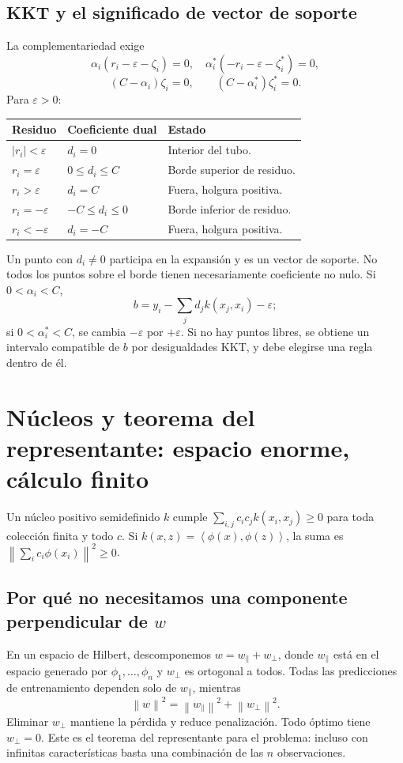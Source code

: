 \documentclass[11pt,a4paper]{article}
\newcommand{\norm}[1]{\left\lVert #1\right\rVert}
\newcommand{\ip}[2]{\left\langle #1,#2\right\rangle}
\theoremstyle{definition}
\begin{document}
\subsection{KKT y el significado de vector de soporte}
La complementariedad exige
\[
\alpha_i(r_i-\varepsilon-\zeta_i)=0,\quad
\alpha_i^*(-r_i-\varepsilon-\zeta_i^*)=0,
\]
\[
(C-\alpha_i)\zeta_i=0,\qquad(C-\alpha_i^*)\zeta_i^*=0.
\]
Para $\varepsilon>0$:
\begin{center}\small
\begin{tabular}{lll}\toprule
Residuo & Coeficiente dual & Estado\\\midrule
$|r_i|<\varepsilon$ & $d_i=0$ & Interior del tubo.\\
$r_i=\varepsilon$ & $0\le d_i\le C$ & Borde superior de residuo.\\
$r_i>\varepsilon$ & $d_i=C$ & Fuera, holgura positiva.\\
$r_i=-\varepsilon$ & $-C\le d_i\le0$ & Borde inferior de residuo.\\
$r_i<-\varepsilon$ & $d_i=-C$ & Fuera, holgura positiva.\\\bottomrule
\end{tabular}
\end{center}
Un punto con $d_i\ne0$ participa en la expansión y es un vector de soporte. No todos los puntos sobre el borde tienen necesariamente coeficiente no nulo. Si $0<\alpha_i<C$,
\[
b=y_i-\sum_jd_jk(x_j,x_i)-\varepsilon;
\]
si $0<\alpha_i^*<C$, se cambia $-\varepsilon$ por $+\varepsilon$. Si no hay puntos libres, se obtiene un intervalo compatible de $b$ por desigualdades KKT, y debe elegirse una regla dentro de él.

\section{Núcleos y teorema del representante: espacio enorme, cálculo finito}
Un núcleo positivo semidefinido $k$ cumple $\sum_{i,j}c_ic_jk(x_i,x_j)\ge0$ para toda colección finita y todo $c$. Si $k(x,z)=\ip{\phi(x)}{\phi(z)}$, la suma es $\norm{\sum_ic_i\phi(x_i)}^2\ge0$.
\subsection{Por qué no necesitamos una componente perpendicular de $w$}
En un espacio de Hilbert, descomponemos $w=w_\parallel+w_\perp$, donde $w_\parallel$ está en el espacio generado por $\phi_1,\ldots,\phi_n$ y $w_\perp$ es ortogonal a todos. Todas las predicciones de entrenamiento dependen solo de $w_\parallel$, mientras
\[
\norm w^2=\norm{w_\parallel}^2+\norm{w_\perp}^2.
\]
Eliminar $w_\perp$ mantiene la pérdida y reduce penalización. Todo óptimo tiene $w_\perp=0$. Este es el teorema del representante para el problema: incluso con infinitas características basta una combinación de las $n$ observaciones.
\end{document}
